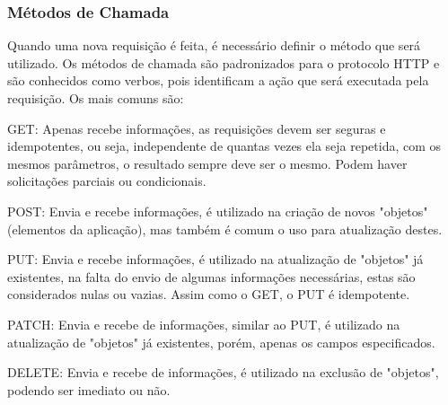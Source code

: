     	\subsubsection{Métodos de Chamada}
    	\label{sec:metodos-chamada}
    	
    	Quando uma nova requisição é feita, é necessário definir o método que será utilizado. Os métodos de chamada são padronizados para o protocolo \gls{HTTP} e são conhecidos como verbos, pois identificam a ação que será executada pela requisição. Os mais comuns são:
    	
        \begin{alineascomponto}
        	\item GET: Apenas recebe informações, as requisições devem ser seguras e idempotentes, ou seja, independente de quantas vezes ela seja repetida, com os mesmos parâmetros, o resultado sempre deve ser o mesmo. Podem haver solicitações parciais ou condicionais.

            \item POST: Envia e recebe informações, é utilizado na criação de novos "objetos" (elementos da aplicação), mas também é comum o uso para atualização destes.
            
            \item PUT: Envia e recebe informações, é utilizado na atualização de "objetos" já existentes, na falta do envio de algumas informações necessárias, estas são considerados nulas ou vazias. Assim como o GET, o PUT é idempotente.
            
            \item PATCH: Envia e recebe de informações, similar ao PUT,  é utilizado na atualização de "objetos" já existentes, porém, apenas os campos especificados.

            \item DELETE: Envia e recebe de informações, é utilizado na exclusão de "objetos", podendo ser imediato ou não.
        \end{alineascomponto}
        
        \begin{table}[h!]	
        	\centering
        \end{table}

